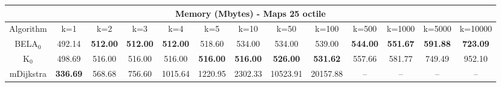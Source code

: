 \begin{tabular}{c|cccccccccccc}\toprule
\multicolumn{13}{c}{Memory (Mbytes) - Maps 25 octile}\\ \midrule
Algorithm & k=1 & k=2 & k=3 & k=4 & k=5 & k=10 & k=50 & k=100 & k=500 & k=1000 & k=5000 & k=10000 \\ \midrule
BELA$_0$ & 492.14 & \textbf{512.00} & \textbf{512.00} & \textbf{512.00} & 518.60 & 534.00 & 534.00 & 539.00 & \textbf{544.00} & \textbf{551.67} & \textbf{591.88} & \textbf{723.09} \\
K$_0$ & 498.69 & 516.00 & 516.00 & 516.00 & \textbf{516.00} & \textbf{516.00} & \textbf{526.00} & \textbf{531.62} & 557.66 & 581.77 & 749.49 & 952.10 \\
mDijkstra & \textbf{336.69} & 568.68 & 756.60 & 1015.64 & 1220.95 & 2302.33 & 10523.91 & 20157.88 & -- & -- & -- & -- \\ \bottomrule 
\end{tabular}
